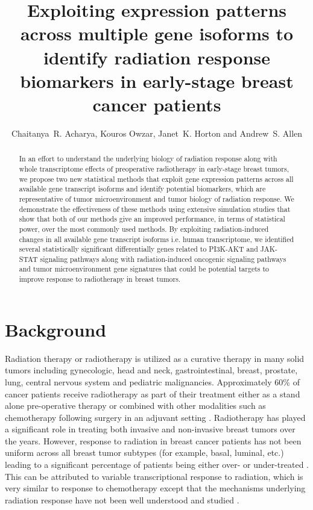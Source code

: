\documentclass[hidelinks,11pt]{article}
\title{Exploiting expression patterns across multiple gene isoforms to identify radiation response biomarkers in early-stage breast cancer patients}
\author{Chaitanya~R. Acharya, Kouros Owzar, Janet~K. Horton and Andrew~S. Allen}
\date{}
\begin{document}
\maketitle



\begin{abstract}
In an effort to understand the underlying biology of radiation response along with whole transcriptome effects of preoperative radiotherapy in early-stage breast tumors, we propose two new statistical methods that exploit gene expression patterns across all available gene transcript isoforms and identify potential biomarkers, which are representative of tumor microenvironment and tumor biology of radiation response. We demonstrate the effectiveness of these methods using extensive simulation studies that show that both of our methods give an improved performance, in terms of statistical power, over the most commonly used methods. By exploiting radiation-induced changes in all available gene transcript isoforms i.e. human transcriptome, we identified several statistically significant differentially genes related to PI3K-AKT and JAK-STAT signaling pathways along with radiation-induced oncogenic signaling pathways and tumor microenvironment gene signatures that could be potential targets to improve response to radiotherapy in breast tumors. 
\end{abstract}

\section*{Background}

Radiation therapy or radiotherapy is utilized as a curative therapy in many solid tumors including gynecologic, head and neck, gastrointestinal, breast, prostate, lung, central nervous system and pediatric malignancies. Approximately 60\% of cancer patients receive radiotherapy as part of their treatment either as a stand alone pre-operative therapy or combined with other modalities such as chemotherapy following surgery in an adjuvant setting \cite{radonc_book}. Radiotherapy has played a significant role in treating both invasive and non-invasive breast tumors over the years. However, response to radiation in breast cancer patients has not been uniform across all breast tumor subtypes (for example, basal, luminal, etc.) leading to a significant percentage of patients being either over- or under-treated \cite{fas,subtypes_rad}. This can be attributed to variable transcriptional response to radiation, which is very similar to response to chemotherapy except that the mechanisms underlying radiation response have not been well understood and studied \cite{Macaeva,Wushou2015}. 
\end{document}
